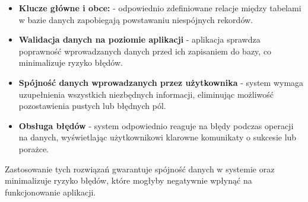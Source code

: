 \begin{itemize}
    \item \textbf{Klucze główne i obce:} - odpowiednio zdefiniowane relacje między tabelami w bazie danych zapobiegają powstawaniu niespójnych rekordów.
    \item \textbf{Walidacja danych na poziomie aplikacji} - aplikacja sprawdza poprawność wprowadzanych danych przed ich zapisaniem do bazy, co minimalizuje ryzyko błędów.
    \item \textbf{Spójność danych wprowadzanych przez użytkownika} - system wymaga uzupełnienia wszystkich niezbędnych informacji, eliminując możliwość pozostawienia pustych lub błędnych pól.
    \item \textbf{Obsługa błędów} - system odpowiednio reaguje na błędy podczas operacji na danych, wyświetlając użytkownikowi klarowne komunikaty o sukcesie lub porażce.
\end{itemize}

Zastosowanie tych rozwiązań gwarantuje spójność danych w systemie oraz minimalizuje ryzyko błędów, które mogłyby negatywnie wpłynąć na funkcjonowanie aplikacji.